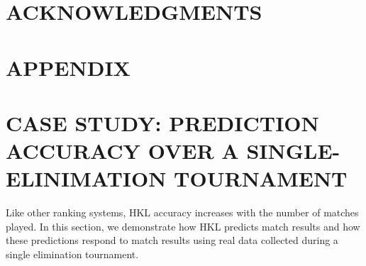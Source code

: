 \documentclass[letterpaper, 10 pt, conference]{ieeeconf}  %
\begin{document}

\section*{ACKNOWLEDGMENTS}


% 

\onecolumn
\section*{APPENDIX}
\setcounter{section}{0}

\section{CASE STUDY: PREDICTION ACCURACY OVER A SINGLE-ELINIMATION TOURNAMENT}
Like other ranking systems, HKL accuracy increases with the number of matches played.
In this section, we demonstrate how HKL predicts match results and how these predictions respond to match results using real data collected during a single elimination tournament.

\end{document}
